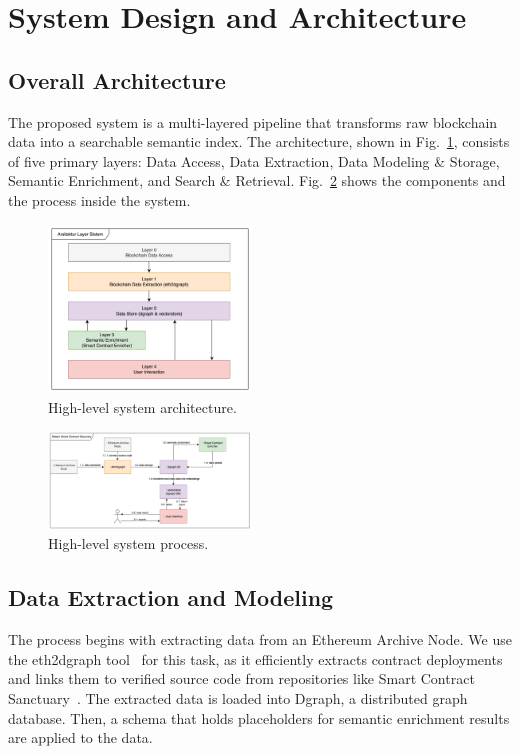 \section{System Design and Architecture}\label{sec:system}

\subsection{Overall Architecture}
The proposed system is a multi-layered pipeline that transforms raw blockchain data into a searchable semantic index. The architecture, shown in Fig.~\ref{fig:architecture}, consists of five primary layers: Data Access, Data Extraction, Data Modeling \& Storage, Semantic Enrichment, and Search \& Retrieval. Fig.~\ref{fig:process} shows the components and the process inside the system.

\begin{figure}[htbp]
	\centerline{\includegraphics[width=0.48\textwidth]{resources/chapter-3/layer-arsitektur-new.png}}
	\caption{High-level system architecture.}\label{fig:architecture}
\end{figure}

\begin{figure}[htbp]
	\centerline{\includegraphics[width=0.48\textwidth]{resources/chapter-3/komponen-utama-new.png}}
	\caption{High-level system process.}\label{fig:process}
\end{figure}

\subsection{Data Extraction and Modeling}
The process begins with extracting data from an Ethereum Archive Node. We use the eth2dgraph tool~\cite{b7} for this task, as it efficiently extracts contract deployments and links them to verified source code from repositories like Smart Contract Sanctuary~\cite{b10}. The extracted data is loaded into Dgraph, a distributed graph database. Then, a schema that holds placeholders for semantic enrichment results are applied to the data.

